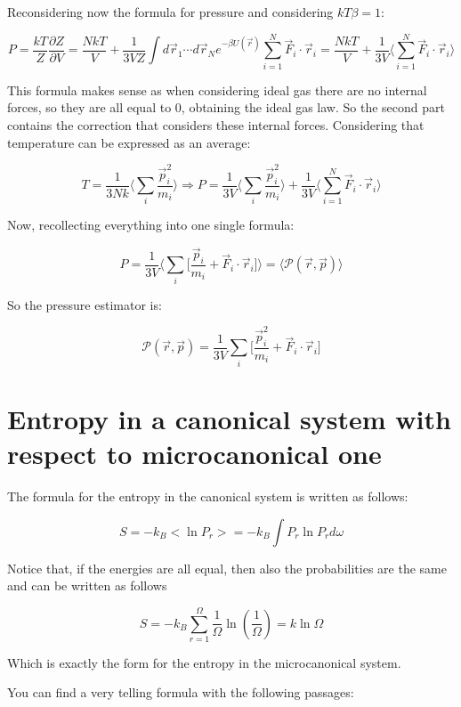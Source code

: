 	Reconsidering now the formula for pressure and considering $kT\beta = 1$:

	$$P = \frac{kT}{Z}\frac{\partial Z}{\partial V} = \frac{NkT}{V} + \frac{1}{3VZ}\int d\vec{r}_1\cdots d\vec{r}_N e^{-\beta U(\vec{r})}\sum\limits_{i=1}^N\vec{F}_i\cdot\vec{r}_i = \frac{NkT}{V} + \frac{1}{3V}\biggl\langle\sum\limits_{i=1}^N\vec{F}_i\cdot\vec{r}_i\biggr\rangle$$

	This formula makes sense as when considering ideal gas there are no internal forces, so they are all equal to $0$, obtaining the ideal gas law.
	So the second part contains the correction that considers these internal forces.
	Considering that temperature can be expressed as an average:

	$$T = \frac{1}{3Nk}\biggl\langle\sum\limits_i\frac{\vec{p}_i^2}{m_i}\biggr\rangle\Rightarrow P = \frac{1}{3V}\biggl\langle\sum\limits_i\frac{\vec{p}^2_i}{m_i}\biggr\rangle + \frac{1}{3V}\biggl\langle\sum\limits_{i=1}^N\vec{F}_i\cdot\vec{r}_i\biggr\rangle$$

	Now, recollecting everything into one single formula:

	$$P = \frac{1}{3V}\biggl\langle\sum\limits_i\biggl[\frac{\vec{p}_i}{m_i}+ \vec{F}_i\cdot\vec{r}_i\biggr]\biggr\rangle = \langle\mathcal{P}(\vec{r}, \vec{p})\rangle$$

	So the pressure estimator is:

	$$\mathcal{P}(\vec{r}, \vec{p}) = \frac{1}{3V}\sum\limits_i\biggl[\frac{\vec{p}_i^2}{m_i}+ \vec{F}_i\cdot\vec{r}_i\biggr]$$

	\section{Entropy in a canonical system with respect to microcanonical one}

	The formula for the entropy in the canonical system is written as follows:

	$$
	S = - k_B <\ln P_r> = - k_B \int{P_r \ln{P_r} d\omega}
	$$

	Notice that, if the energies are all equal, then also the probabilities are the same and can be written as follows

	$$
	S = - k_B \sum_{r = 1}^\Omega{\frac{1}{\Omega} \ln{\left(\frac{1}{\Omega}\right)}} = k \ln \Omega
	$$

	Which is exactly the form for the entropy in the microcanonical system.


	You can find a very telling formula with the following passages:

